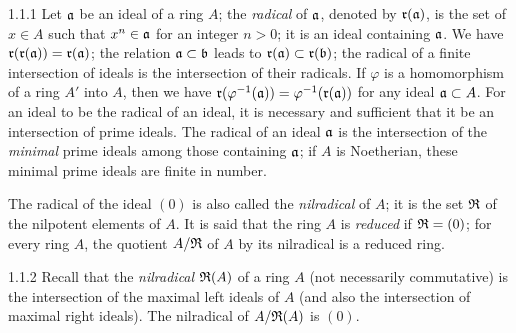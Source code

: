 \documentclass[../main.tex]{subfiles}
\begin{document}
\begin{cx}{1.1.1}
Let $\mathfrak{a}$ be an ideal of a ring $A$; the \emph{radical} of $\mathfrak{a}$, denoted
by $\mathfrak{r}(\mathfrak{a})$, is the set of $x\in A$ such that $x^n\in\mathfrak{a}$ for an integer $n>0$; it is an
ideal containing $\mathfrak{a}$. We have $\mathfrak{r}(\mathfrak{r}(\mathfrak{a}))=\mathfrak{r}(\mathfrak{a})$; the relation $\mathfrak{a}\subset\mathfrak{b}$
leads to $\mathfrak{r}(\mathfrak{a})\subset\mathfrak{r}(\mathfrak{b})$; the radical of a finite intersection of ideals is the
intersection of their radicals. If $\varphi$  is a homomorphism of a ring $A'$ into $A$, then we
have $\mathfrak{r}(\varphi^{-1}(\mathfrak{a}))=\varphi^{-1}(\mathfrak{r}(\mathfrak{a}))$
for any ideal $\mathfrak{a}\subset A$. For an ideal to be the radical of an ideal,
it is necessary and sufficient that it be an intersection of prime ideals. The radical of an
ideal $\mathfrak{a}$ is the intersection of the
\emph{minimal} prime ideals among those containing $\mathfrak{a}$; if $A$ is
Noetherian, these minimal prime ideals are finite in number.

The radical of the ideal $(0)$ is also called the \emph{nilradical} of $A$; it is the set
$\mathfrak{R}$ of the nilpotent elements of $A$. It is said that the ring $A$ is \emph{reduced} if
$\mathfrak{R}=(0)$; for every ring $A$, the quotient $A/\mathfrak{R}$ of $A$ by its nilradical is a
reduced ring.
\end{cx}

\begin{cx}{1.1.2}
Recall that the \emph{nilradical} $\mathfrak{R}(A)$ of a ring $A$ (not necessarily commutative) is the
intersection of the maximal left ideals of $A$ (and also the intersection of maximal
right ideals). The nilradical of $A/\mathfrak{R}(A)$ is $(0)$.
\end{cx}
\end{document}
